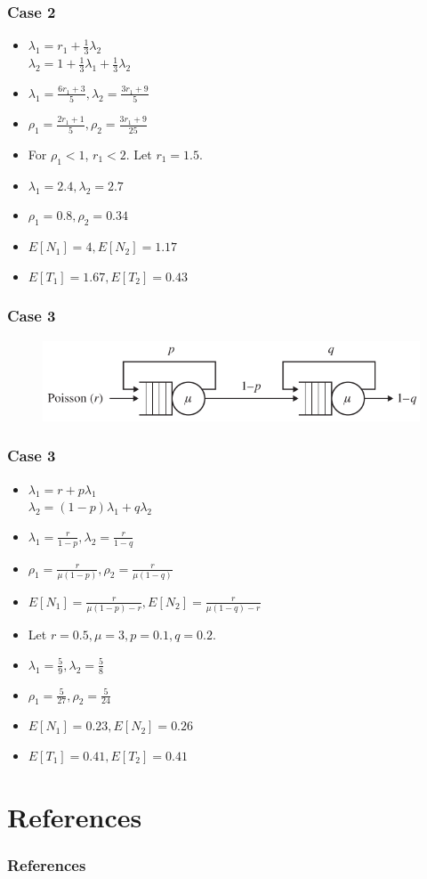 \documentclass[10pt,notes]{beamer}
\begin{document}
\begin{frame}
    \frametitle{Case 2}
    \begin{itemize}
        \item $\lambda_1 = r_1 + \frac{1}{3}\lambda_2$ \\
            $\lambda_2 = 1 + \frac{1}{3}\lambda_1 + \frac{1}{3}\lambda_2$ \\
        \item $\lambda_1 = \frac{6r_1 + 3}{5}, \lambda_2 = \frac{3r_1 + 9}{5}$
        \item $\rho_1 = \frac{2r_1 + 1}{5}, \rho_2 = \frac{3r_1 + 9}{25}$
        \item For $\rho_1 < 1$, $r_1 < 2$. Let $r_1 = 1.5$.
        \item $\lambda_1 = 2.4, \lambda_2 = 2.7$
        \item $\rho_1 = 0.8, \rho_2 = 0.34$
        \item $E[N_1] = 4, E[N_2] = 1.17$
        \item $E[T_1] = 1.67, E[T_2] = 0.43$
    \end{itemize}
\end{frame}

\begin{frame}
    \frametitle{Case 3}
    \begin{figure}
        \includegraphics[width=0.75\linewidth]{images/case3.png}
    \end{figure}
\end{frame}

\begin{frame}
    \frametitle{Case 3}
    \begin{itemize}
        \item $\lambda_1 = r + p\lambda_1$ \\
            $\lambda_2 = (1 - p)\lambda_1 + q\lambda_2$ \\
        \item $\lambda_1 = \frac{r}{1 - p}, \lambda_2 = \frac{r}{1 - q}$
        \item $\rho_1 = \frac{r}{\mu(1 - p)}, \rho_2 = \frac{r}{\mu(1 - q)}$
        \item $E[N_1] = \frac{r}{\mu(1 - p) - r}, E[N_2] = \frac{r}{\mu(1 - q) - r}$
        \item Let $r = 0.5, \mu = 3, p = 0.1, q = 0.2$.
        \item $\lambda_1 = \frac{5}{9}, \lambda_2 = \frac{5}{8}$
        \item $\rho_1 = \frac{5}{27}, \rho_2 = \frac{5}{24}$
        \item $E[N_1] = 0.23, E[N_2] = 0.26$
        \item $E[T_1] = 0.41, E[T_2] = 0.41$
    \end{itemize}
\end{frame}

\section{References}

\begin{frame}
    \frametitle{References}
    \nocite{*}
    \printbibliography
\end{frame}
\end{document}
